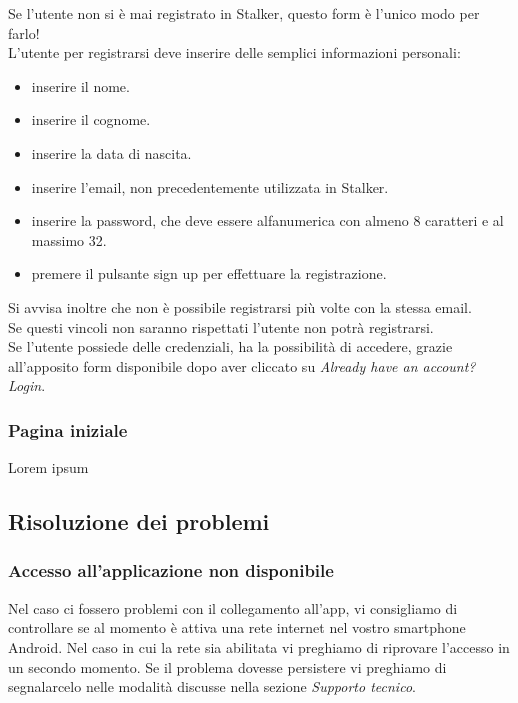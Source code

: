 \documentclass[../manuale-utente.tex]{subfiles}
\begin{document}
Se l'utente non si è mai registrato in Stalker, questo form è l'unico modo per farlo!\\
L'utente per registrarsi deve inserire delle semplici informazioni personali:

\begin{itemize}
    \item inserire il nome.
    \item inserire il cognome.
    \item inserire la data di nascita.
    \item inserire l'email, non precedentemente utilizzata in Stalker.
    \item inserire la password, che deve essere alfanumerica con almeno 8 caratteri e al massimo 32.
    \item premere il pulsante sign up per effettuare la registrazione.
\end{itemize}

Si avvisa inoltre che non è possibile registrarsi più volte con la stessa email.\\
Se questi vincoli non saranno rispettati l'utente non potrà registrarsi.\\
Se l'utente possiede delle credenziali, ha la possibilità di accedere, grazie all'apposito form disponibile dopo aver cliccato su \textit{Already have an account? Login}.
\newpage

\subsubsection{Pagina iniziale}%
\label{sub:pagina_iniziale}


Lorem ipsum

\newpage
\subsection{Risoluzione dei problemi}

\subsubsection{Accesso all'applicazione non disponibile}

Nel caso ci fossero problemi con il collegamento all'app, vi consigliamo di controllare se al momento è attiva una rete internet nel vostro smartphone Android.
Nel caso in cui la rete sia abilitata vi preghiamo di riprovare l’accesso in un secondo momento.
Se il problema dovesse persistere vi preghiamo di segnalarcelo nelle modalità discusse nella sezione \emph{Supporto tecnico}.
\end{document}

